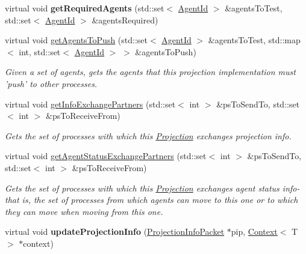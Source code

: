 \begin{DoxyCompactItemize}
\item 
\hypertarget{classrepast_1_1_shared_base_grid_a810df20298f76741ab58907fb5e20749}{virtual void {\bfseries get\-Required\-Agents} (std\-::set$<$ \hyperlink{classrepast_1_1_agent_id}{Agent\-Id} $>$ \&agents\-To\-Test, std\-::set$<$ \hyperlink{classrepast_1_1_agent_id}{Agent\-Id} $>$ \&agents\-Required)}\label{classrepast_1_1_shared_base_grid_a810df20298f76741ab58907fb5e20749}

\item 
virtual void \hyperlink{classrepast_1_1_shared_base_grid_ab1486e7698288efc1218653d4e5e1e15}{get\-Agents\-To\-Push} (std\-::set$<$ \hyperlink{classrepast_1_1_agent_id}{Agent\-Id} $>$ \&agents\-To\-Test, std\-::map$<$ int, std\-::set$<$ \hyperlink{classrepast_1_1_agent_id}{Agent\-Id} $>$ $>$ \&agents\-To\-Push)
\begin{DoxyCompactList}\small\item\em Given a set of agents, gets the agents that this projection implementation must 'push' to other processes. \end{DoxyCompactList}\item 
virtual void \hyperlink{classrepast_1_1_shared_base_grid_af4323686714c4f6216125db5609c3184}{get\-Info\-Exchange\-Partners} (std\-::set$<$ int $>$ \&ps\-To\-Send\-To, std\-::set$<$ int $>$ \&ps\-To\-Receive\-From)
\begin{DoxyCompactList}\small\item\em Gets the set of processes with which this \hyperlink{classrepast_1_1_projection}{Projection} exchanges projection info. \end{DoxyCompactList}\item 
virtual void \hyperlink{classrepast_1_1_shared_base_grid_a0388d98240eb59548058d3c45da702d7}{get\-Agent\-Status\-Exchange\-Partners} (std\-::set$<$ int $>$ \&ps\-To\-Send\-To, std\-::set$<$ int $>$ \&ps\-To\-Receive\-From)
\begin{DoxyCompactList}\small\item\em Gets the set of processes with which this \hyperlink{classrepast_1_1_projection}{Projection} exchanges agent status info-\/ that is, the set of processes from which agents can move to this one or to which they can move when moving from this one. \end{DoxyCompactList}\item 
\hypertarget{classrepast_1_1_shared_base_grid_abe043188d6e0f7dd350aed6d78c4b98e}{virtual void {\bfseries update\-Projection\-Info} (\hyperlink{classrepast_1_1_projection_info_packet}{Projection\-Info\-Packet} $\ast$pip, \hyperlink{classrepast_1_1_context}{Context}$<$ T $>$ $\ast$context)}\label{classrepast_1_1_shared_base_grid_abe043188d6e0f7dd350aed6d78c4b98e}

\end{DoxyCompactItemize}
